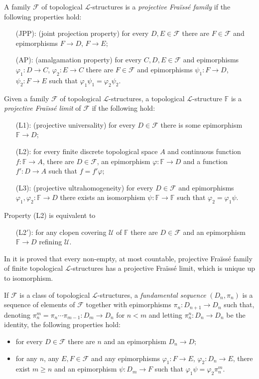 \documentclass[12pt,twoside,a4paper]{amsart}
\theoremstyle{plain}
\theoremstyle{definition}
\begin{document}
A family $ \mathcal F $ of topological $ \mathcal L $-structures is a {\it projective Fra\"iss\'e family} if the following properties hold:
\begin{itemize}
\item[(JPP):] (joint projection property) for every $D,E\in \mathcal F $ there are $F\in \mathcal F $ and epimorphisms $F\to D$, $F\to E$;
\item[(AP):] (amalgamation property) for every $C,D,E\in \mathcal F $ and epimorphisms $ {\varphi}_1:D\to C$, $ {\varphi}_2:E\to C$ there are $F\in \mathcal F $ and epimorphisms $\psi_1:F\to D$, $\psi_2:F\to E$ such that $ {\varphi}_1\psi_1= {\varphi}_2\psi_2$.
\end{itemize}
Given a family $ \mathcal F $ of topological $ \mathcal L $-structures, a topological $ \mathcal L $-structure $ \mathbb F $ is a {\it projective Fra\"iss\'e limit} of $ \mathcal F $ if the following hold:
\begin{itemize}
\item[(L1):] (projective universality) for every $D\in \mathcal F $ there is some epimorphism $ \mathbb F \to D$;
\item[(L2):] for every finite discrete topological space $A$ and continuous function $f: \mathbb F \to A$, there are $D\in \mathcal F $, an epimorphism $ {\varphi} : \mathbb F \to D$ and a function $f':D\to A$ such that $f=f' {\varphi} $;
\item[(L3):] (projective ultrahomogeneity) for every $D\in \mathcal F $ and epimorphisms $ {\varphi}_1, {\varphi}_2: \mathbb F \to D$ there exists an isomorphism $\psi : \mathbb F \to \mathbb F $ such that $ {\varphi}_2= {\varphi}_1\psi $.
\end{itemize}
Property (L2) is equivalent to
\begin{itemize}
\item[(L2$'$):] for any clopen covering $ \mathcal U $ of $ \mathbb F $ there are $D\in \mathcal F $ and an epimorphism $ \mathbb F \to D$ refining $ \mathcal U $.
\end{itemize}
In \cite{Irwin2006} it is proved that every non-empty, at most countable, projective Fra\"iss\'e family of finite topological $ \mathcal L $-structures has a projective Fra\"iss\'e limit, which is unique up to isomorphism.

If $ \mathcal F $ is a class of topological $ \mathcal L $-structures, a {\it fundamental sequence} $(D_n,\pi_n)$ is a sequence of elements of $ \mathcal F $ together with epimorphisms $\pi_n:D_{n+1}\to D_n$ such that, denoting $\pi_n^m=\pi_n\cdots\pi_{m-1}:D_m\to D_n$ for $n<m$ and letting $\pi_n^n:D_n\to D_n$ be the identity, the following properties hold:
\begin{itemize}
\item for every $D\in \mathcal F $ there are $n$ and an epimorphism $D_n\to D$;
\item for any $n$, any $E,F\in \mathcal F $ and any epimorphisms $ {\varphi}_1 :F\to E$, $ {\varphi}_2:D_n\to E$, there exist $m\geq n$ and an epimorphism $\psi :D_m\to F$ such that $ {\varphi}_1\psi= {\varphi}_2\pi_n^m$.
\end{itemize}
\end{document}
